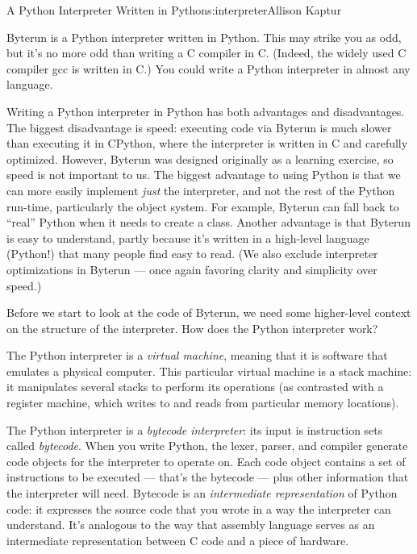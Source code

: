 \begin{aosachapter}{A Python Interpreter Written in Python}{s:interpreter}{Allison Kaptur}
\label{a-python-python-interpreter}

Byterun is a Python interpreter written in Python. This may strike you
as odd, but it's no more odd than writing a C compiler in C. (Indeed,
the widely used C compiler gcc is written in C.) You could write a
Python interpreter in almost any language.

Writing a Python interpreter in Python has both advantages and
disadvantages. The biggest disadvantage is speed: executing code via
Byterun is much slower than executing it in CPython, where the
interpreter is written in C and carefully optimized. However, Byterun
was designed originally as a learning exercise, so speed is not
important to us. The biggest advantage to using Python is that we can
more easily implement \emph{just} the interpreter, and not the rest of
the Python run-time, particularly the object system. For example,
Byterun can fall back to ``real'' Python when it needs to create a
class. Another advantage is that Byterun is easy to understand, partly
because it's written in a high-level language (Python!) that many people
find easy to read. (We also exclude interpreter optimizations in Byterun
--- once again favoring clarity and simplicity over speed.)

\label{building-an-interpreter}

Before we start to look at the code of Byterun, we need some
higher-level context on the structure of the interpreter. How does the
Python interpreter work?

The Python interpreter is a \emph{virtual machine}, meaning that it is
software that emulates a physical computer. This particular virtual
machine is a stack machine: it manipulates several stacks to perform its
operations (as contrasted with a register machine, which writes to and
reads from particular memory locations).

The Python interpreter is a \emph{bytecode interpreter}: its input is
instruction sets called \emph{bytecode}. When you write Python, the
lexer, parser, and compiler generate code objects for the interpreter to
operate on. Each code object contains a set of instructions to be
executed --- that's the bytecode --- plus other information that the
interpreter will need. Bytecode is an \emph{intermediate representation}
of Python code: it expresses the source code that you wrote in a way the
interpreter can understand. It's analogous to the way that assembly
language serves as an intermediate representation between C code and a
piece of hardware.


\end{aosachapter}
